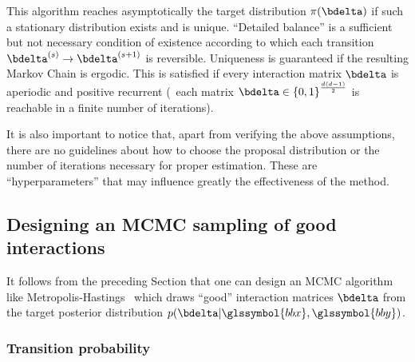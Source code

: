 This algorithm reaches asymptotically the target distribution $\pi(\bdelta)$ if such a stationary distribution exists and is unique. ``Detailed balance'' is a sufficient but not necessary condition of existence according to which each transition $\bdelta^{(s)} \rightarrow \bdelta^{(s+1)}$ is reversible. Uniqueness is guaranteed if the resulting Markov Chain is ergodic. This is satisfied if every interaction matrix $\bdelta$ is aperiodic and positive recurrent (\ each matrix $\bdelta \in {\{0,1\}}^{\frac{d(d-1)}{2}}$ is reachable in a finite number of iterations). 

It is also important to notice that, apart from verifying the above assumptions, there are no guidelines about how to choose the proposal distribution or the number of iterations necessary for proper estimation. These are ``hyperparameters'' that may influence greatly the effectiveness of the method.

\subsection{Designing an MCMC sampling of good interactions}

It follows from the preceding Section that one can design an MCMC algorithm like Metropolis-Hastings~\cite{hastings1970monte} which draws ``good'' interaction matrices $\bdelta$ from the target posterior distribution $p(\bdelta | \glssymbol{bbx},\glssymbol{bby})$.

\subsubsection{Transition probability}


